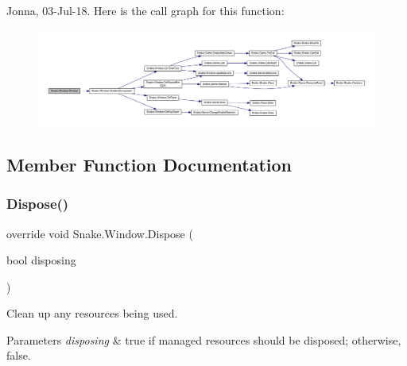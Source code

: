 Jonna, 03-\/\+Jul-\/18. Here is the call graph for this function\+:
\nopagebreak
\begin{figure}[H]
\begin{center}
\leavevmode
\includegraphics[width=350pt]{d8/dae/class_snake_1_1_window_ab6ea319a57aaf8656b86df24bab0f810_cgraph}
\end{center}
\end{figure}


\subsection{Member Function Documentation}
\mbox{\label{class_snake_1_1_window_aeb80b0d2ae454bee60c5b587574884d6}} 
\subsubsection{\texorpdfstring{Dispose()}{Dispose()}}
{\footnotesize\ttfamily override void Snake.\+Window.\+Dispose (\begin{DoxyParamCaption}\item[{bool}]{disposing }\end{DoxyParamCaption})\hspace{0.3cm}{\ttfamily [protected]}}



Clean up any resources being used. 


\begin{DoxyParams}{Parameters}
{\em disposing} & true if managed resources should be disposed; otherwise, false.\\
\hline
\end{DoxyParams}
\mbox{\label{class_snake_1_1_window_a2291066b4718678884b7d69ae8360407}} 
